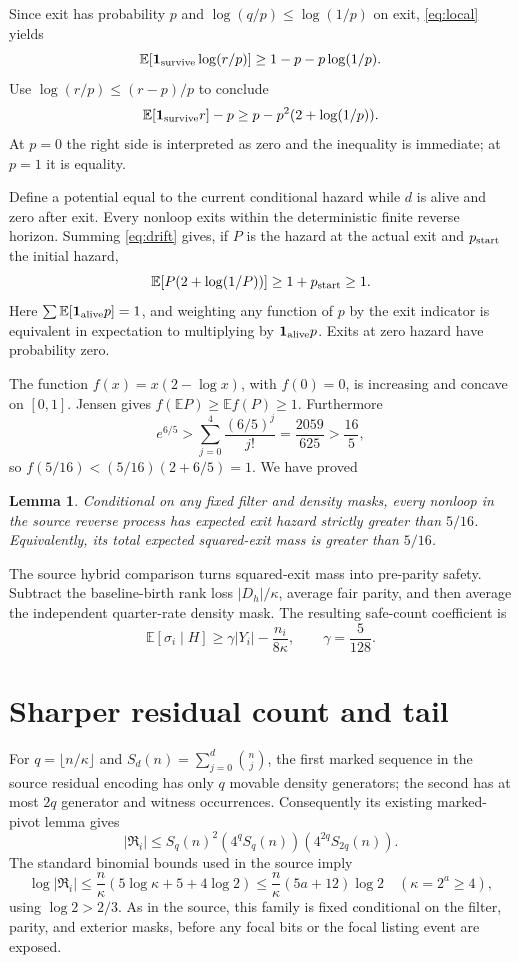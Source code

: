 \documentclass[11pt]{article}
\newtheorem{lemma}{Lemma}
\newcommand{\E}{\mathbb E}
\newcommand{\one}{\mathbf 1}
\begin{document}
Since exit has probability $p$ and $\log(q/p)\le\log(1/p)$ on exit,
\eqref{eq:local} yields
\[
 \E[\one_{\rm survive}\log(r/p)]\ge1-p-p\log(1/p).
\]
Use $\log(r/p)\le(r-p)/p$ to conclude
\begin{equation}\label{eq:drift}
 \E[\one_{\rm survive}r]-p
 \ge p-p^2(2+\log(1/p)).
\end{equation}
At $p=0$ the right side is interpreted as zero and the inequality is
immediate; at $p=1$ it is equality.

Define a potential equal to the current conditional hazard while $d$ is
alive and zero after exit. Every nonloop exits within the deterministic
finite reverse horizon. Summing \eqref{eq:drift} gives, if $P$ is the hazard
at the actual exit and $p_{\rm start}$ the initial hazard,
\begin{equation}\label{eq:global}
 \E[P(2+\log(1/P))]\ge1+p_{\rm start}\ge1.
\end{equation}
Here $\sum\E[\one_{\rm alive}p]=1$, and weighting any function of $p$
by the exit indicator is equivalent in expectation to multiplying by
$\one_{\rm alive}p$. Exits at zero hazard have probability zero.

The function $f(x)=x(2-\log x)$, with $f(0)=0$, is increasing and
concave on $[0,1]$. Jensen gives $f(\E P)\ge\E f(P)\ge1$.
Furthermore
\[
 e^{6/5}>\sum_{j=0}^4\frac{(6/5)^j}{j!}
 =\frac{2059}{625}>\frac{16}{5},
\]
so $f(5/16)<(5/16)(2+6/5)=1$. We have proved
\begin{lemma}\label{lem:hazard}
Conditional on any fixed filter and density masks, every nonloop in the
source reverse process has expected exit hazard strictly greater than
$5/16$. Equivalently, its total expected squared-exit mass is greater
than $5/16$.
\end{lemma}

The source hybrid comparison turns squared-exit mass into pre-parity
safety. Subtract the baseline-birth rank loss $|D_h|/\kappa$, average
fair parity, and then average the independent quarter-rate density mask.
The resulting safe-count coefficient is
\[
 \E[\sigma_i\mid H]\ge\gamma|Y_i|-\frac{n_i}{8\kappa},
 \qquad\gamma=\frac{5}{128}.
\]

\section{Sharper residual count and tail}

For $q=\lfloor n/\kappa\rfloor$ and
$S_d(n)=\sum_{j=0}^d\binom nj$, the first marked sequence in the
source residual encoding has only $q$ movable density generators;
the second has at most $2q$ generator and witness occurrences.
Consequently its existing marked-pivot lemma gives
\[
 |\mathfrak R_i|\le S_q(n)^2(4^qS_q(n))(4^{2q}S_{2q}(n)).
\]
The standard binomial bounds used in the source imply
\[
 \log|\mathfrak R_i|\le\frac n\kappa
    (5\log\kappa+5+4\log2)
 \le\frac n\kappa(5a+12)\log2\quad(\kappa=2^a\ge4),
\]
using $\log2>2/3$. As in the source, this family is fixed conditional
on the filter, parity, and exterior masks, before any focal bits or
the focal listing event are exposed.
\end{document}
